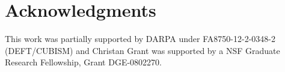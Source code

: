 \documentclass{vldb}
\begin{document}






\balance

\section{Acknowledgments}
This work was partially supported by DARPA under FA8750-12-2-0348-2
(DEFT/CUBISM) and Christan Grant was supported by a NSF Graduate Research
Fellowship, Grant DGE-0802270.


\small

\end{document}
